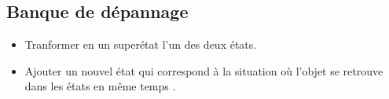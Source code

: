 \subsection{Banque de dépannage}


\begin{itemize}
	\item[$\mathbf{\star}$] Tranformer en un superétat l'un des deux états.
	\item Ajouter un nouvel état qui correspond à la situation où l'objet se retrouve dans les états en même temps .
\end{itemize}


